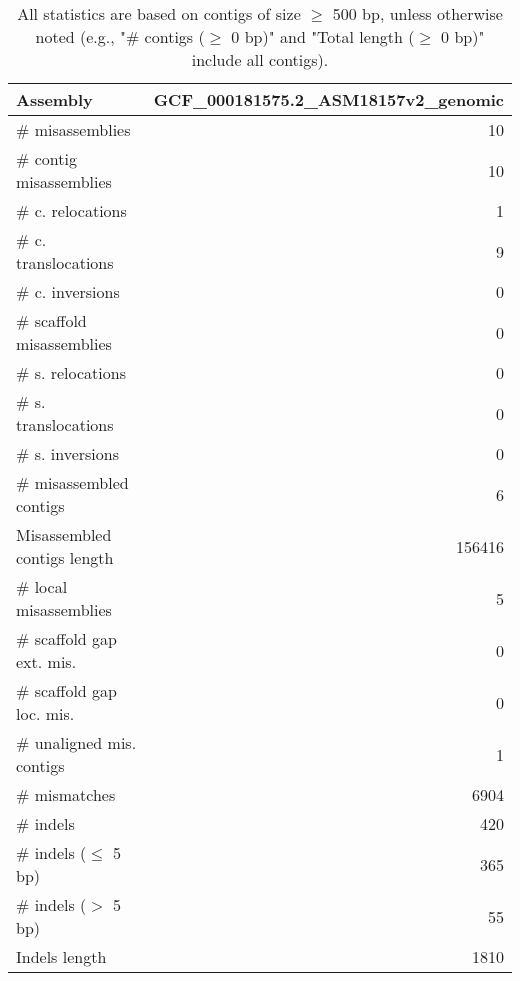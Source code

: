\documentclass[12pt,a4paper]{article}
\begin{document}
\begin{table}[ht]
\begin{center}
\caption{All statistics are based on contigs of size $\geq$ 500 bp, unless otherwise noted (e.g., "\# contigs ($\geq$ 0 bp)" and "Total length ($\geq$ 0 bp)" include all contigs).}
\begin{tabular}{|l*{1}{|r}|}
\hline
Assembly & GCF\_000181575.2\_ASM18157v2\_genomic \\ \hline
\# misassemblies & 10 \\ \hline
\hspace{2mm}\# contig misassemblies & 10 \\ \hline
\hspace{5mm}\# c. relocations & 1 \\ \hline
\hspace{5mm}\# c. translocations & 9 \\ \hline
\hspace{5mm}\# c. inversions & 0 \\ \hline
\hspace{2mm}\# scaffold misassemblies & 0 \\ \hline
\hspace{5mm}\# s. relocations & 0 \\ \hline
\hspace{5mm}\# s. translocations & 0 \\ \hline
\hspace{5mm}\# s. inversions & 0 \\ \hline
\# misassembled contigs & 6 \\ \hline
Misassembled contigs length & 156416 \\ \hline
\# local misassemblies & 5 \\ \hline
\# scaffold gap ext. mis. & 0 \\ \hline
\# scaffold gap loc. mis. & 0 \\ \hline
\# unaligned mis. contigs & 1 \\ \hline
\# mismatches & 6904 \\ \hline
\# indels & 420 \\ \hline
\hspace{5mm}\# indels ($\leq$ 5 bp) & 365 \\ \hline
\hspace{5mm}\# indels ($>$ 5 bp) & 55 \\ \hline
Indels length & 1810 \\ \hline
\end{tabular}
\end{center}
\end{table}
\end{document}
